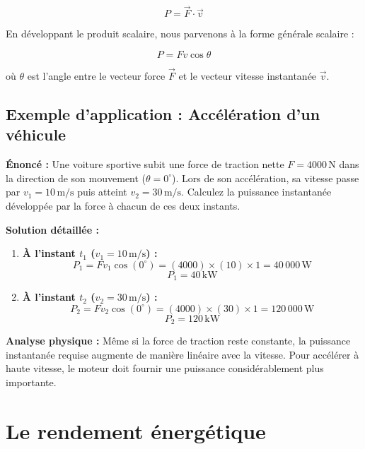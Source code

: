 \documentclass[11pt,openany]{book}
\begin{document}
\[
\boxed{P = \vec{F} \cdot \vec{v}}
\]

En développant le produit scalaire, nous parvenons à la forme générale scalaire :

\[
\boxed{P = F v \cos\theta}
\]

où $\theta$ est l'angle entre le vecteur force $\vec{F}$ et le vecteur vitesse instantanée $\vec{v}$.

\subsection*{Exemple d'application : Accélération d'un véhicule}

\noindent\textbf{Énoncé :} Une voiture sportive subit une force de traction nette $F = \mathrm{4000\,N}$ dans la direction de son mouvement ($\theta = 0^\circ$). Lors de son accélération, sa vitesse passe par $v_1 = \mathrm{10\,m/s}$ puis atteint $v_2 = \mathrm{30\,m/s}$. Calculez la puissance instantanée développée par la force à chacun de ces deux instants.

\vspace{0.2cm}

\noindent\textbf{Solution détaillée :}

\begin{enumerate}
    \item \textbf{À l'instant $t_1$ ($v_1 = \mathrm{10\,m/s}$) :}
    \[
    P_1 = F v_1 \cos(0^\circ) = (4000) \times (10) \times 1 = 40\,000\,\mathrm{W}
    \]
    \[
    \boxed{P_1 = \mathrm{40\,kW}}
    \]

    \item \textbf{À l'instant $t_2$ ($v_2 = \mathrm{30\,m/s}$) :}
    \[
    P_2 = F v_2 \cos(0^\circ) = (4000) \times (30) \times 1 = 120\,000\,\mathrm{W}
    \]
    \[
    \boxed{P_2 = \mathrm{120\,kW}}
    \]
\end{enumerate}

\noindent\textbf{Analyse physique :} Même si la force de traction reste constante, la puissance instantanée requise augmente de manière linéaire avec la vitesse. Pour accélérer à haute vitesse, le moteur doit fournir une puissance considérablement plus importante.

\section{Le rendement énergétique}
\end{document}
